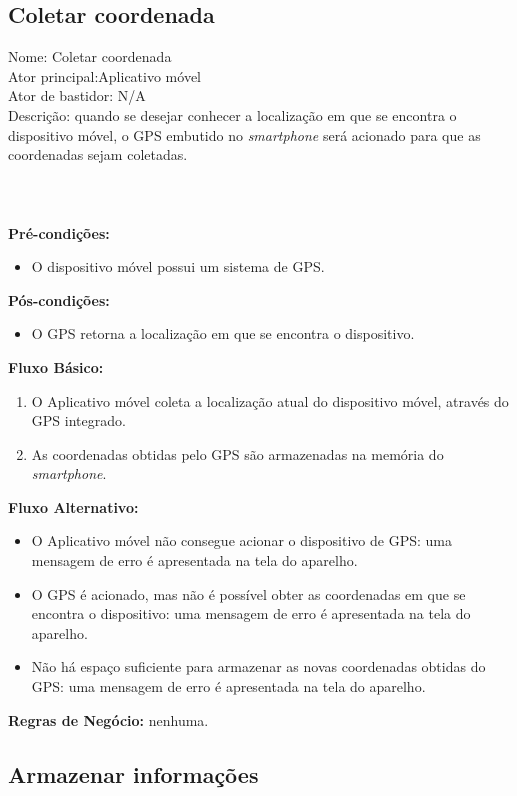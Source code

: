 \subsection{Coletar coordenada }

\noindent Nome: Coletar coordenada\\
Ator principal:Aplicativo móvel\\
Ator de bastidor: N/A\\
Descrição: quando se desejar conhecer a localização em que se encontra o dispositivo móvel, o GPS embutido no \textit{smartphone} será acionado para que as coordenadas sejam coletadas. \\\\\\\\
\textbf{Pré-condições:}
	\begin{itemize}
		\item O dispositivo móvel possui um sistema de GPS.
	\end{itemize}
\textbf{Pós-condições:}
	\begin{itemize}
		\item O GPS retorna a localização em que se encontra o dispositivo.
	\end{itemize}	
\textbf{Fluxo Básico:}
	\begin{enumerate}
		\item O Aplicativo móvel coleta a localização atual do dispositivo móvel, através do GPS integrado.
		\item As coordenadas obtidas pelo GPS são armazenadas na memória do \textit{smartphone}.
	\end{enumerate}	
\textbf{Fluxo Alternativo:}
	\begin{itemize}
		\item O Aplicativo móvel não consegue acionar o dispositivo de GPS: uma mensagem de erro é apresentada na tela do aparelho.
		\item O GPS é acionado, mas não é possível obter as coordenadas em que se encontra o dispositivo: uma mensagem de erro é apresentada na tela do aparelho.
		\item Não há espaço suficiente para armazenar as novas coordenadas obtidas do GPS: uma mensagem de erro é apresentada na tela do aparelho.
	\end{itemize}
\textbf{Regras de Negócio:}	nenhuma.
\subsection{Armazenar informações }

